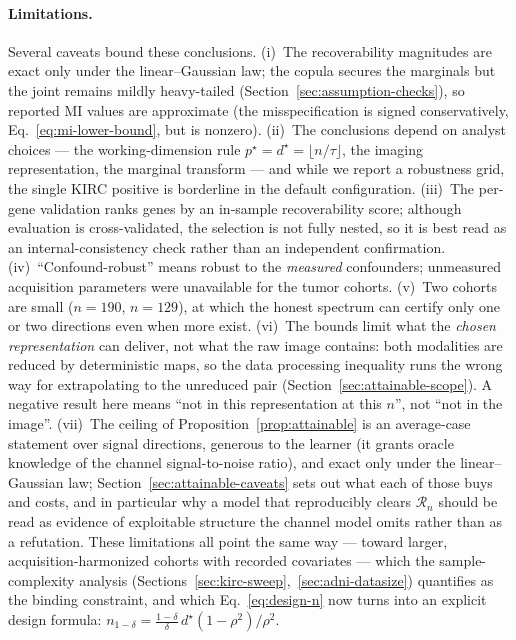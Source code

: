 \documentclass{article}
\begin{document}
\paragraph{Limitations.}
Several caveats bound these conclusions. (i)~The recoverability magnitudes are
exact only under the linear--Gaussian law; the copula secures the marginals but
the joint remains mildly heavy-tailed (Section~\ref{sec:assumption-checks}), so
reported MI values are approximate (the misspecification is signed conservatively,
Eq.~\eqref{eq:mi-lower-bound}, but is nonzero). (ii)~The conclusions depend on
analyst choices --- the working-dimension rule $p^\star=d^\star=\lfloor n/\tau\rfloor$,
the imaging representation, the marginal transform --- and while we report a
robustness grid, the single KIRC positive is borderline in the default
configuration. (iii)~The per-gene validation ranks genes by an in-sample
recoverability score; although evaluation is cross-validated, the selection is
not fully nested, so it is best read as an internal-consistency check rather than
an independent confirmation. (iv)~``Confound-robust'' means robust to the
\emph{measured} confounders; unmeasured acquisition parameters were unavailable
for the tumor cohorts. (v)~Two cohorts are small ($n=190$, $n=129$), at which
the honest spectrum can certify only one or two directions even when more exist.
(vi)~The bounds limit what the \emph{chosen representation} can deliver, not
what the raw image contains: both modalities are reduced by deterministic maps,
so the data processing inequality runs the wrong way for extrapolating to the
unreduced pair (Section~\ref{sec:attainable-scope}). A negative result here means
``not in this representation at this $n$'', not ``not in the image''.
(vii)~The ceiling of Proposition~\ref{prop:attainable} is an average-case
statement over signal directions, generous to the learner (it grants oracle
knowledge of the channel signal-to-noise ratio), and exact only under the
linear--Gaussian law; Section~\ref{sec:attainable-caveats} sets out what each of
those buys and costs, and in particular why a model that reproducibly clears
$\mathcal{R}_n$ should be read as evidence of exploitable structure the channel
model omits rather than as a refutation.
These limitations all point the same way --- toward larger, acquisition-harmonized
cohorts with recorded covariates --- which the sample-complexity analysis
(Sections~\ref{sec:kirc-sweep},~\ref{sec:adni-datasize}) quantifies as the binding
constraint, and which Eq.~\eqref{eq:design-n} now turns into an explicit design
formula: $n_{1-\delta} = \tfrac{1-\delta}{\delta}\,d^\star(1-\rho^2)/\rho^2$.
\end{document}
